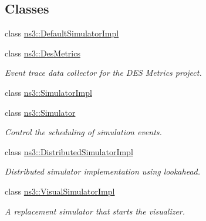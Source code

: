 \subsection*{Classes}
\begin{DoxyCompactItemize}
\item 
class \hyperlink{classns3_1_1DefaultSimulatorImpl}{ns3\+::\+Default\+Simulator\+Impl}
\item 
class \hyperlink{classns3_1_1DesMetrics}{ns3\+::\+Des\+Metrics}
\begin{DoxyCompactList}\small\item\em Event trace data collector for the D\+ES Metrics project. \end{DoxyCompactList}\item 
class \hyperlink{classns3_1_1SimulatorImpl}{ns3\+::\+Simulator\+Impl}
\item 
class \hyperlink{classns3_1_1Simulator}{ns3\+::\+Simulator}
\begin{DoxyCompactList}\small\item\em Control the scheduling of simulation events. \end{DoxyCompactList}\item 
class \hyperlink{classns3_1_1DistributedSimulatorImpl}{ns3\+::\+Distributed\+Simulator\+Impl}
\begin{DoxyCompactList}\small\item\em Distributed simulator implementation using lookahead. \end{DoxyCompactList}\item 
class \hyperlink{classns3_1_1VisualSimulatorImpl}{ns3\+::\+Visual\+Simulator\+Impl}
\begin{DoxyCompactList}\small\item\em A replacement simulator that starts the visualizer. \end{DoxyCompactList}\end{DoxyCompactItemize}
